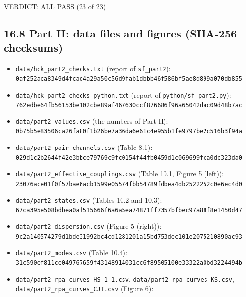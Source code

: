 \documentclass[
  10pt,
]{article}
\providecommand{\tightlist}{%
  \setlength{\itemsep}{0pt}\setlength{\parskip}{0pt}}
\begin{document}
VERDICT: ALL PASS (23 of 23)

\hypertarget{part-ii-data-files-and-figures-sha-256-checksums}{%
\subsection{16.8 Part II: data files and figures (SHA-256
checksums)}\label{part-ii-data-files-and-figures-sha-256-checksums}}

\begin{itemize}
\tightlist
\item
  \texttt{data/hck\_part2\_checks.txt} (report of \texttt{sf\_part2}):\\
  \texttt{0af252aca8349d4fcad4a29a50c56d9fab1dbbb46f586bf5ae8d899a070db855}
\item
  \texttt{data/hck\_part2\_checks\_python.txt} (report of
  \texttt{python/sf\_part2.py}):\\
  \texttt{762edbe64fb56153be102cbe89af467630ccf876686f96a65042dac09d48b7ac}
\item
  \texttt{data/part2\_values.csv} (the numbers of Part II):\\
  \texttt{0b75b5e83506ca26fa80f1b26be7a36da6e61c4e955b1fe9797be2c516b3f94a}
\item
  \texttt{data/part2\_pair\_channels.csv} (Table 8.1):\\
  \texttt{029d1c2b2644f42e3bbce79769c9fc0154f44fb0459d1c069699fca0dc323da0}
\item
  \texttt{data/part2\_effective\_couplings.csv} (Table 10.1, Figure 5
  (left)):\\
  \texttt{23076ace01f0f57bae6acb1599e05574fbb54789fdbea4db2522252c0e6ec4d0}
\item
  \texttt{data/part2\_states.csv} (Tables 10.2 and 10.3):\\
  \texttt{67ca395e508bdbea0af515666f6a6a5ea74871ff7357bfbec97a88f8e1450d47}
\item
  \texttt{data/part2\_dispersion.csv} (Figure 5 (right)):\\
  \texttt{9c2a140574279d1bde31992bc4cd1281201a15bd753dec101e2075210890ac93}
\item
  \texttt{data/part2\_modes.csv} (Table 10.4):\\
  \texttt{31c590ef811ce049767659f43148914031cc6f89505100e33322a0bd3224494b}
\item
  \texttt{data/part2\_rpa\_curves\_HS\_1\_1.csv},
  \texttt{data/part2\_rpa\_curves\_KS.csv},
  \texttt{data/part2\_rpa\_curves\_CJT.csv} (Figure 6):\\

\end{itemize}
\end{document}

